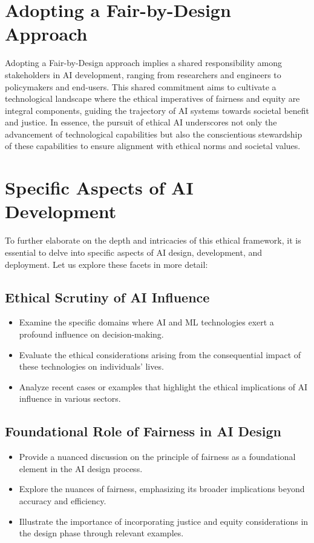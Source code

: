 \section*{Adopting a Fair-by-Design Approach}

Adopting a Fair-by-Design approach implies a shared responsibility among stakeholders in AI development, ranging from researchers and engineers to policymakers and end-users. This shared commitment aims to cultivate a technological landscape where the ethical imperatives of fairness and equity are integral components, guiding the trajectory of AI systems towards societal benefit and justice. In essence, the pursuit of ethical AI underscores not only the advancement of technological capabilities but also the conscientious stewardship of these capabilities to ensure alignment with ethical norms and societal values.

\section*{Specific Aspects of AI Development}

To further elaborate on the depth and intricacies of this ethical framework, it is essential to delve into specific aspects of AI design, development, and deployment. Let us explore these facets in more detail:

\subsection*{Ethical Scrutiny of AI Influence}

\begin{itemize}[label=--]
    \item Examine the specific domains where AI and ML technologies exert a profound influence on decision-making.
    \item Evaluate the ethical considerations arising from the consequential impact of these technologies on individuals' lives.
    \item Analyze recent cases or examples that highlight the ethical implications of AI influence in various sectors.
\end{itemize}

\subsection*{Foundational Role of Fairness in AI Design}

\begin{itemize}[label=--]
    \item Provide a nuanced discussion on the principle of fairness as a foundational element in the AI design process.
    \item Explore the nuances of fairness, emphasizing its broader implications beyond accuracy and efficiency.
    \item Illustrate the importance of incorporating justice and equity considerations in the design phase through relevant examples.
\end{itemize}

